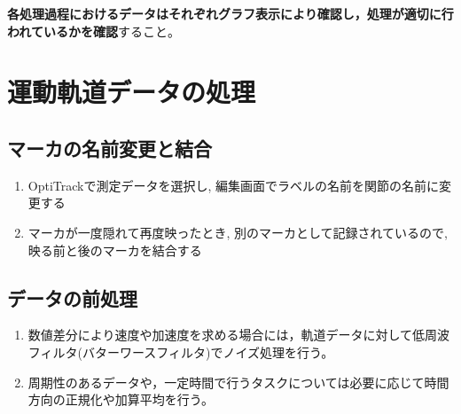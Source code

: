 \documentclass{ltjsarticle}
\begin{document}
\textbf{各処理過程におけるデータはそれぞれグラフ表示により確認し，処理が適切に行われているかを確認}すること。

\section{運動軌道データの処理}

\subsection{マーカの名前変更と結合}
\begin{enumerate}
  \item OptiTrackで測定データを選択し, 編集画面でラベルの名前を関節の名前に変更する
  \item マーカが一度隠れて再度映ったとき, 別のマーカとして記録されているので, 映る前と後のマーカを結合する
\end{enumerate}

\subsection{データの前処理}
\begin{enumerate}
  \item 数値差分により速度や加速度を求める場合には，軌道データに対して低周波フィルタ(バターワースフィルタ)でノイズ処理を行う。
  \item 周期性のあるデータや，一定時間で行うタスクについては必要に応じて時間方向の正規化や加算平均を行う。
\end{enumerate}

\end{document}
